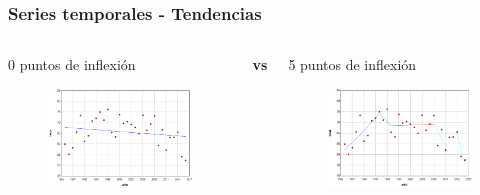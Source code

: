 \documentclass{beamer}
\begin{document}
\begin{frame}\frametitle{Series temporales - Tendencias}
	\begin{columns}
		\begin{column}{0.5\textwidth}
			\centering \normalsize 0 puntos de inflexión
			\begin{figure}
				\includegraphics[width=\textwidth]{images/jpo0.png}
			\end{figure}

		\end{column}
		\large{\textbf{vs}}
		\begin{column}{0.5\textwidth}
			\centering \normalsize 5 puntos de inflexión
			\begin{figure}
				\centering
				\includegraphics[width=\textwidth]{images/jpo5.png}
			\end{figure}
		\end{column}
	\end{columns}
\end{frame}
\end{document}
